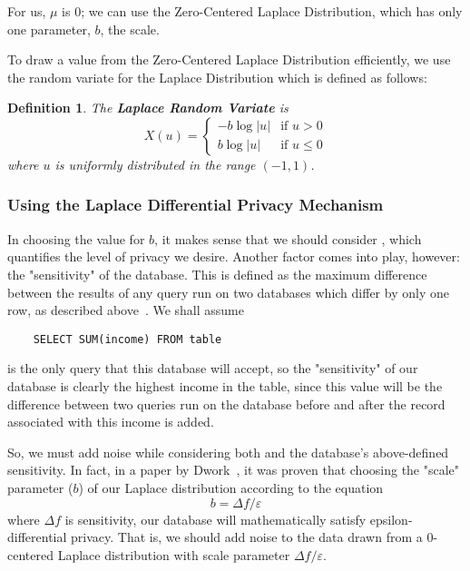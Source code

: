 \documentclass[conference,11pt]{IEEEtran}
\newtheorem{definition}{Definition}
\begin{document}
For us, $\mu$ is 0; we can use the Zero-Centered Laplace Distribution, which has only one 
parameter, $b$, the scale.

To draw a value from the Zero-Centered Laplace Distribution efficiently, we use
the random variate for the Laplace Distribution which is defined as follows:
\begin{mdframed}
    \begin{definition}\label{def:laplace-variate}
        The \textbf{Laplace Random Variate} is
        \begin{equation}
            X(u) =
                \begin{cases}
                    -b \log|u| & \text{if }u > 0\\
                    b \log|u| & \text{if }u \leq 0
                \end{cases}
        \end{equation}
        where $u$ is uniformly distributed in the range $(-1, 1)$.
    \end{definition}
\end{mdframed}

\subsubsection{Using the Laplace Differential Privacy Mechanism}\label{sec:using-laplace-dp}
In choosing the value for $b$, it makes sense that we should consider
\textepsilon, which quantifies the level of privacy we desire. Another factor
comes into play, however: the "sensitivity" of the database. This is defined as
the maximum difference between the results of any query run on two databases
which differ by only one row, as described above~\cite{Atockar:2014}. We shall
assume

\begin{verbatim}
    SELECT SUM(income) FROM table
\end{verbatim}
is the only query that this database will accept, so the "sensitivity" of our
database is clearly the highest income in the table, since this value will be
the difference between two queries run on the database before and after the
record associated with this income is added.

So, we must add noise while considering both {\textepsilon} and the database's
above-defined sensitivity. In fact, in a paper by
Dwork~\cite{Dwork:2011:private-data-analysis}, it was proven that choosing the
"scale" parameter ($b$) of our Laplace distribution according to the equation
\begin{equation}
    b = {\Delta}f/\varepsilon
\end{equation}
where ${\Delta}f$ is sensitivity, our database will mathematically satisfy
epsilon-differential privacy. That is, we should add noise to the data drawn
from a 0-centered Laplace distribution with scale parameter
${\Delta}f/\varepsilon$.
\end{document}
